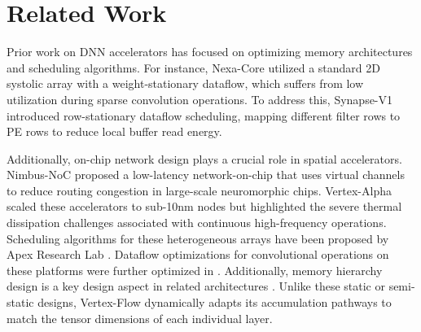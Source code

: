\section{Related Work}
\label{sec:related}
Prior work on DNN accelerators has focused on optimizing memory architectures and scheduling algorithms. For instance, Nexa-Core \cite{nexa2024} utilized a standard 2D systolic array with a weight-stationary dataflow, which suffers from low utilization during sparse convolution operations. To address this, Synapse-V1 \cite{synapse2023} introduced row-stationary dataflow scheduling, mapping different filter rows to PE rows to reduce local buffer read energy.

Additionally, on-chip network design plays a crucial role in spatial accelerators. Nimbus-NoC \cite{nimbus2022} proposed a low-latency network-on-chip that uses virtual channels to reduce routing congestion in large-scale neuromorphic chips. Vertex-Alpha \cite{vertex2025} scaled these accelerators to sub-10nm nodes but highlighted the severe thermal dissipation challenges associated with continuous high-frequency operations. Scheduling algorithms for these heterogeneous arrays have been proposed by Apex Research Lab \cite{apex2023, apex2024}. Dataflow optimizations for convolutional operations on these platforms were further optimized in \cite{synapse2022}. Additionally, memory hierarchy design is a key design aspect in related architectures \cite{nexa2023, vertex2024}. Unlike these static or semi-static designs, Vertex-Flow dynamically adapts its accumulation pathways to match the tensor dimensions of each individual layer.
